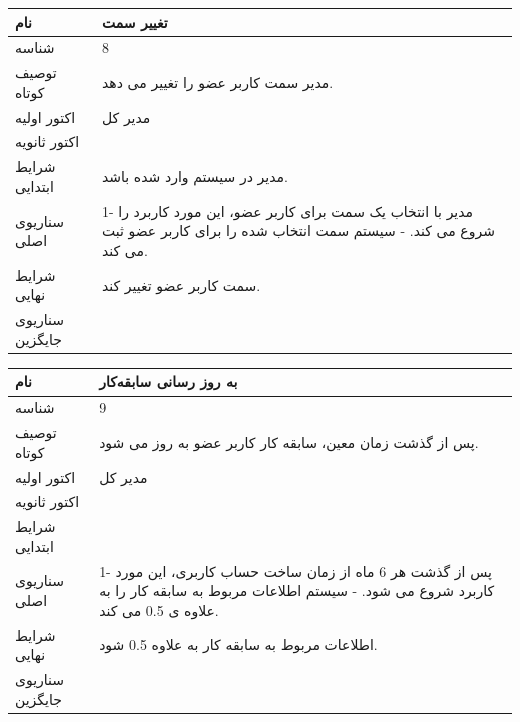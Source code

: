 \begin{tabular}{|p{2cm}|p{10cm}|}
\hline
نام
&
تغییر سمت
\\
\hline
شناسه
&
8
\\
\hline
توصیف کوتاه
&
مدیر سمت کاربر عضو را تغییر می دهد.
\\
\hline
اکتور اولیه
&
مدیر کل
\\
\hline
اکتور ثانویه
&

\\
\hline
شرایط ابتدایی
&
مدیر در سیستم وارد شده باشد.
\\
\hline
سناریوی اصلی
&
1-	مدیر با انتخاب یک سمت برای کاربر عضو، این مورد کاربرد را شروع می کند.
\newline
2-	سیستم سمت انتخاب شده را برای کاربر عضو ثبت می کند.
\\
\hline
شرایط نهایی
&
سمت کاربر عضو تغییر کند.
\\
\hline
سناریوی جایگزین
&

\\
\hline
\end{tabular}

\vspace{2cm}


\begin{tabular}{|p{2cm}|p{10cm}|}
\hline
نام
&
به روز رسانی سابقه‌کار
\\
\hline
شناسه
&
9
\\
\hline
توصیف کوتاه
&
پس از گذشت زمان معین، سابقه کار کاربر عضو به روز می شود.
\\
\hline
اکتور اولیه
&
مدیر کل
\\
\hline
اکتور ثانویه
&

\\
\hline
شرایط ابتدایی
&

\\
\hline
سناریوی اصلی
&
1-	پس از گذشت هر 6 ماه از زمان ساخت حساب کاربری، این مورد کاربرد شروع می شود.
\newline
2-	سیستم اطلاعات مربوط به سابقه کار را به علاوه ی 0.5 می کند.
\\
\hline
شرایط نهایی
&
اطلاعات مربوط به سابقه کار به علاوه 0.5 شود.
\\
\hline
سناریوی جایگزین
&

\\
\hline
\end{tabular}

\vspace{2cm}

